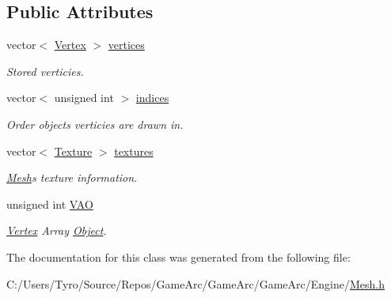 \subsection*{Public Attributes}
\begin{DoxyCompactItemize}
\item 
\mbox{\label{class_mesh_abe5c05c224e47ba1e8b6393759798a9b}} 
vector$<$ \mbox{\hyperlink{struct_vertex}{Vertex}} $>$ \mbox{\hyperlink{class_mesh_abe5c05c224e47ba1e8b6393759798a9b}{vertices}}
\begin{DoxyCompactList}\small\item\em Stored verticies. \end{DoxyCompactList}\item 
\mbox{\label{class_mesh_a464d9a1d7e7a4f67321dffc1e8b44b7d}} 
vector$<$ unsigned int $>$ \mbox{\hyperlink{class_mesh_a464d9a1d7e7a4f67321dffc1e8b44b7d}{indices}}
\begin{DoxyCompactList}\small\item\em Order object\textquotesingle{}s verticies are drawn in. \end{DoxyCompactList}\item 
\mbox{\label{class_mesh_a09bf4e8307bf7717c56501ca6293c6c0}} 
vector$<$ \mbox{\hyperlink{struct_texture}{Texture}} $>$ \mbox{\hyperlink{class_mesh_a09bf4e8307bf7717c56501ca6293c6c0}{textures}}
\begin{DoxyCompactList}\small\item\em \mbox{\hyperlink{class_mesh}{Mesh}}\textquotesingle{}s texture information. \end{DoxyCompactList}\item 
\mbox{\label{class_mesh_a79afa055e485fb65b1a7aa5b8eda2940}} 
unsigned int \mbox{\hyperlink{class_mesh_a79afa055e485fb65b1a7aa5b8eda2940}{V\+AO}}
\begin{DoxyCompactList}\small\item\em \mbox{\hyperlink{struct_vertex}{Vertex}} Array \mbox{\hyperlink{class_object}{Object}}. \end{DoxyCompactList}\end{DoxyCompactItemize}


The documentation for this class was generated from the following file\+:\begin{DoxyCompactItemize}
\item 
C\+:/\+Users/\+Tyro/\+Source/\+Repos/\+Game\+Arc/\+Game\+Arc/\+Game\+Arc/\+Engine/\mbox{\hyperlink{_mesh_8h}{Mesh.\+h}}\end{DoxyCompactItemize}
